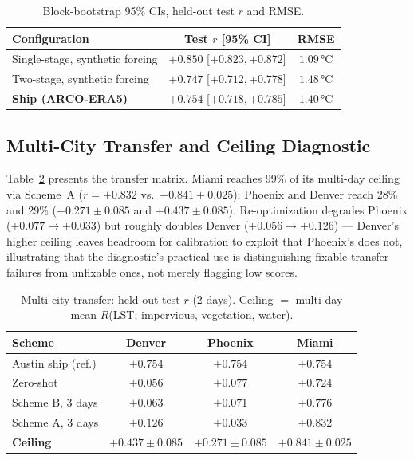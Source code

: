 \documentclass[conference]{IEEEtran}
\begin{document}
\begin{table}[ht]
  \centering
  \caption{Block-bootstrap 95\% CIs, held-out test $r$ and RMSE.}
  \label{tab:bootstrap_ci}
  \scriptsize
  \begin{tabular}{lcc}
    \toprule
    Configuration & Test $r$ [95\% CI] & RMSE \\
    \midrule
    Single-stage, synthetic forcing & $+0.850$ [$+0.823,+0.872$] & $1.09$\,°C \\
    Two-stage, synthetic forcing & $+0.747$ [$+0.712,+0.778$] & $1.48$\,°C \\
    \textbf{Ship (ARCO-ERA5)} & $\mathbf{+0.754}$ [$+0.718,+0.785$] & $\mathbf{1.40}$\,°C \\
    \bottomrule
  \end{tabular}
\end{table}

\subsection{Multi-City Transfer and Ceiling Diagnostic}
Table~\ref{tab:transfer} presents the transfer matrix. Miami reaches 99\%
of its multi-day ceiling via Scheme~A ($r{=}{+}0.832$ vs.\
$+0.841\pm0.025$); Phoenix and Denver reach 28\% and 29\%
($+0.271\pm0.085$ and $+0.437\pm0.085$). Re-optimization degrades Phoenix
($+0.077\to+0.033$) but roughly doubles Denver ($+0.056\to+0.126$) —
Denver's higher ceiling leaves headroom for calibration to exploit that
Phoenix's does not, illustrating that the diagnostic's practical use is
distinguishing fixable transfer failures from unfixable ones, not merely
flagging low scores.

\begin{table}[ht]
  \centering
  \caption{Multi-city transfer: held-out test $r$ (2 days). Ceiling $=$ multi-day mean $R$(LST; impervious, vegetation, water).}
  \label{tab:transfer}
  \scriptsize
  \setlength{\tabcolsep}{3pt}
  \begin{tabular}{lccc}
    \toprule
    Scheme & Denver & Phoenix & Miami \\
    \midrule
    Austin ship (ref.) & $+0.754$ & $+0.754$ & $+0.754$ \\
    Zero-shot        & $+0.056$ & $+0.077$ & $+0.724$ \\
    Scheme B, 3 days & $+0.063$ & $+0.071$ & $+0.776$ \\
    Scheme A, 3 days & $+0.126$ & $+0.033$ & $+0.832$ \\
    \midrule
    \textbf{Ceiling} & $\mathbf{+0.437\pm0.085}$ & $\mathbf{+0.271\pm0.085}$ & $\mathbf{+0.841\pm0.025}$ \\
    \bottomrule
  \end{tabular}
\end{table}
\end{document}
